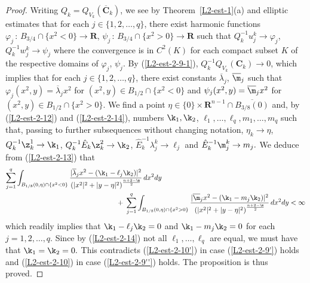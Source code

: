 \documentclass[a4paper,11pt]{amsart}
\begin{document}
\begin{proof}
Writing $Q_{k} = Q_{V_{k}}(\overline{\mathbf C}_{k})$, we see 
by Theorem~\ref{L2-est-1}(a) and elliptic estimates that for each $j \in \{1, 2, \ldots, q\}$, there exist harmonic 
functions $\varphi_{j}  \, : \, B_{3/4} \cap \{x^{2} < 0\} \to {\mathbf R}$, $\psi_{j} \, : \, B_{3/4} \cap \{x^{2} > 0\} \to {\mathbf R}$ such that 
$Q_{k}^{-1}u_{j}^{k} \to \varphi_{j}$, $Q_{k}^{-1}w^{k}_{j} \to \psi_{j}$ where the convergence is in $C^{2}(K)$ for each compact subset $K$ of the respective domains of $\varphi_{j}$, $\psi_{j}$. By (\ref{L2-est-2-9-1}), $Q_{k}^{-1}Q_{V_{k}}({\mathbf C}_{k}) \to 0$, which implies that for each $j \in \{1, 2, \ldots, q\}$, 
there exist constants $\overline{\lambda}_{j}$, $\overline{\m}_{j}$ such that $\varphi_{j}(x^{2}, y) = \overline{\lambda}_{j}x^{2}$ for $(x^{2}, y) \in B_{1/2} \cap \{x^{2} <0\}$ and 
$\psi_{j}(x^{2}, y) = \overline{\m}_{j}x^{2}$ for $(x^{2}, y) \in B_{1/2} \cap \{x^{2} > 0\}.$ We find a point $\eta \in \{0\}\times {\mathbf R}^{n-1} \cap \overline{B_{3/8}(0)}$ and, by (\ref{L2-est-2-12}) and (\ref{L2-est-2-14}), numbers $\k_{1}, \k_{2}$, $\ell_{1}, \ldots, \ell_{q}, m_{1}, \ldots, m_{q}$  such that, passing to further subsequences without changing notation, $\eta_{k} \to \eta$, $Q_{k}^{-1}\z^{1}_{k} \to \k_{1}$, $Q_{k}^{-1}{\hat E}_{k}\z^{2}_{k} \to \k_{2}$,  ${\hat E}_{k}^{-1}\lambda_{j}^{k} \to \ell_{j}$ and ${\hat E}_{k}^{-1}\m_{j}^{k} \to m_{j}.$ 
We deduce from (\ref{L2-est-2-13}) that 
\begin{eqnarray*}
\sum_{j=1}^{q} \int_{B_{1/8}(0,\eta) \cap \{x^{2} <0\}} \frac{|\overline{\lambda}_{j}x^{2} - (\k_{1} - \ell_{j}\k_{2})|^{2}}{\left(|x^{2}|^{2} + |y -\eta|^{2}\right)^{\frac{n+2-\m}{2}}} \, dx^{2} dy&&\nonumber\\
&&\hspace{-1in} + \; \sum_{j=1}^{q}\int_{B_{1/8}(0,\eta) \cap \{x^{2} >0\}}\frac{|\overline{\m}_{j}x^{2} - (\k_{1} - m_{j}\k_{2})|^{2}}{\left(|x^{2}|^{2}+|y - \eta|^{2}\right)^{\frac{n+2-\m}{2}}} \, dx^{2}dy < \infty
\end{eqnarray*}
which readily implies that $\k_{1} - \ell_{j}\k_{2}=0$ and $\k_{1} - m_{j}\k_{2} = 0$ for each $j=1, 2, \ldots, q.$ Since by 
(\ref{L2-est-2-14}) not all $\ell_{1}, \ldots, \ell_{q}$ are equal, we must have that $\k_{1}= \k_{2} = 0.$ This contradicts (\ref{L2-est-2-10'}) in case (\ref{L2-est-2-9'}) holds and (\ref{L2-est-2-10}) in case 
(\ref{L2-est-2-9''}) holds. The proposition is thus proved.
\end{proof}
\end{document}
